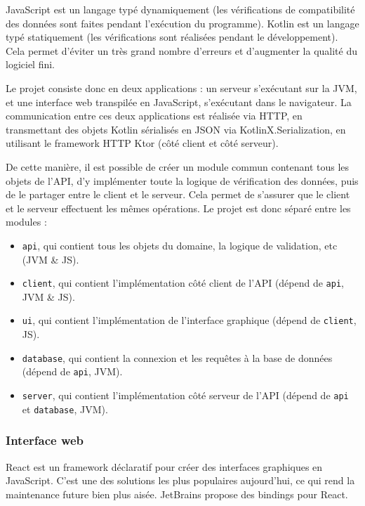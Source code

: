 JavaScript est un langage typé dynamiquement (les vérifications de compatibilité des données sont faites pendant l'exécution du programme).
Kotlin est un langage typé statiquement (les vérifications sont réalisées pendant le développement).
Cela permet d'éviter un très grand nombre d'erreurs et d'augmenter la qualité du logiciel fini.

\uparagraph
Le projet consiste donc en deux applications : un serveur s'exécutant sur la JVM, et une interface web transpilée en JavaScript, s'exécutant dans le navigateur.
La communication entre ces deux applications est réalisée via HTTP, en transmettant des objets Kotlin sérialisés en JSON via KotlinX.Serialization, en utilisant le framework HTTP Ktor (côté client et côté serveur).

De cette manière, il est possible de créer un module commun contenant tous les objets de l'API, d'y implémenter toute la logique de vérification des données, puis de le partager entre le client et le serveur.
Cela permet de s'assurer que le client et le serveur effectuent les mêmes
opérations.
Le projet est donc séparé entre les modules :
\begin{itemize}
	\item \lstinline{api}, qui contient tous les objets du domaine, la logique de validation, etc (JVM \& JS).
	\item \lstinline{client}, qui contient l'implémentation côté client de l'API (dépend de \lstinline{api}, JVM \& JS).
	\item \lstinline{ui}, qui contient l'implémentation de l'interface graphique (dépend de \lstinline{client}, JS).
	\item \lstinline{database}, qui contient la connexion et les requêtes à la base de données (dépend de \lstinline{api}, JVM).
	\item \lstinline{server}, qui contient l'implémentation côté serveur de l'API (dépend de \lstinline{api} et \lstinline{database}, JVM).
\end{itemize}

\subsubsection{Interface web}

React est un framework déclaratif pour créer des interfaces graphiques en JavaScript.
C'est une des solutions les plus populaires aujourd'hui, ce qui rend la maintenance future bien plus aisée.
JetBrains propose des bindings pour React.

